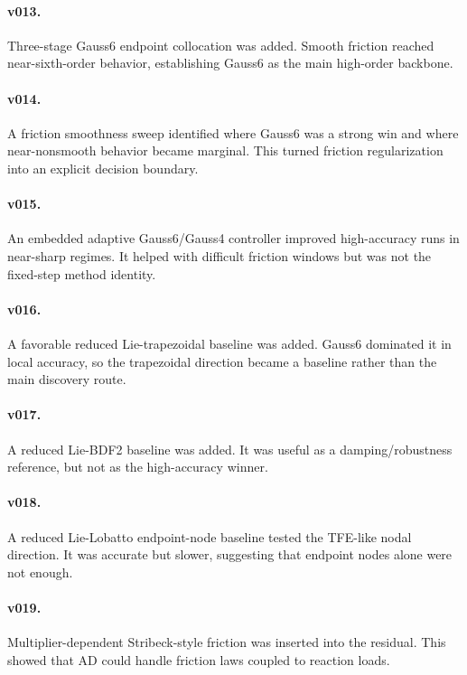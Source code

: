\documentclass[10pt]{article}
\begin{document}
\paragraph{v013.}
Three-stage Gauss6 endpoint collocation was added. Smooth friction reached
near-sixth-order behavior, establishing Gauss6 as the main high-order
backbone.

\paragraph{v014.}
A friction smoothness sweep identified where Gauss6 was a strong win and where
near-nonsmooth behavior became marginal. This turned friction regularization
into an explicit decision boundary.

\paragraph{v015.}
An embedded adaptive Gauss6/Gauss4 controller improved high-accuracy runs in
near-sharp regimes. It helped with difficult friction windows but was not the
fixed-step method identity.

\paragraph{v016.}
A favorable reduced Lie-trapezoidal baseline was added. Gauss6 dominated it in
local accuracy, so the trapezoidal direction became a baseline rather than the
main discovery route.

\paragraph{v017.}
A reduced Lie-BDF2 baseline was added. It was useful as a damping/robustness
reference, but not as the high-accuracy winner.

\paragraph{v018.}
A reduced Lie-Lobatto endpoint-node baseline tested the TFE-like nodal
direction. It was accurate but slower, suggesting that endpoint nodes alone
were not enough.

\paragraph{v019.}
Multiplier-dependent Stribeck-style friction was inserted into the residual.
This showed that AD could handle friction laws coupled to reaction loads.
\end{document}
